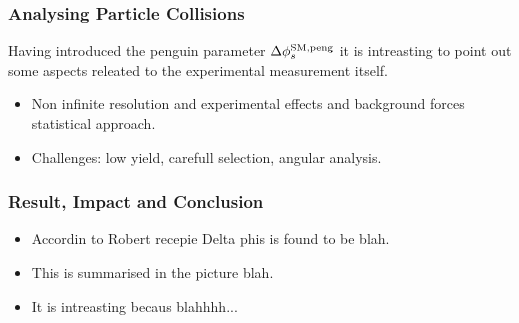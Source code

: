 \subsubsection{Analysing Particle Collisions}
Having introduced the penguin parameter $\Delta\phi_{s}^{\tiny\text{SM,peng}}$ it is intreasting to point out some
aspects releated to the experimental measurement itself.

\begin{itemize}
\item Non infinite resolution and experimental effects and background forces statistical approach.
\item Challenges: low yield, carefull selection, angular analysis.
\end{itemize}

\subsubsection{Result, Impact and Conclusion}

\begin{itemize}
\item Accordin to Robert recepie Delta phis is found to be blah.
\item This is summarised in the picture blah.
\item It is intreasting becaus blahhhh...
\end{itemize}
